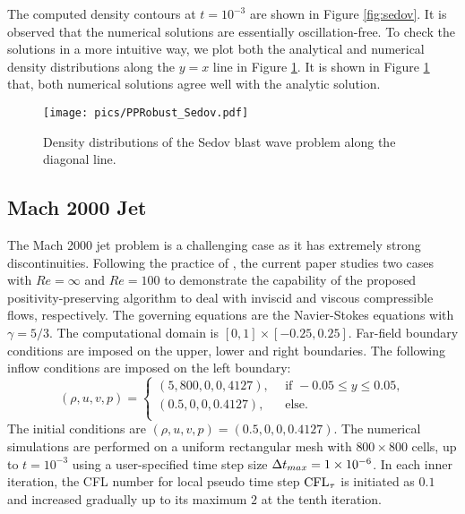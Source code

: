 The computed density contours at $t=10^{-3}$ are shown in Figure \ref{fig:sedov}. It is observed that the numerical solutions are essentially oscillation-free. To check the solutions in a more intuitive way, we plot both the analytical and numerical density distributions along the $y=x$ line in Figure \ref{fig:sedovLine}.
It is shown in Figure \ref{fig:sedovLine} that, both numerical solutions agree well with the analytic solution.

\begin{figure}[htbp]
    \centering
    \texttt{[image: pics/PPRobust\_Sedov.pdf]}
    \caption{Density distributions of the Sedov blast wave problem along the diagonal line.}
    \label{fig:sedovLine}
\end{figure}






\subsection{Mach 2000 Jet}

The Mach 2000 jet problem \cite{zhang2010positivity} is a challenging case as it has extremely strong discontinuities.
Following the practice of \cite{huang2024general},
the current paper studies two cases with $Re=\infty$ and $Re=100$ to demonstrate the capability of the proposed positivity-preserving algorithm to deal with inviscid and viscous compressible flows, respectively.
The governing equations are the Navier-Stokes equations with $\gamma=5/3$.
The computational domain is $[0,1]\times[-0.25,0.25]$.
Far-field boundary conditions are imposed on the upper, lower and right boundaries. The following inflow conditions are imposed on the left boundary:
\begin{equation}
    (\rho,u,v,p) = \left\{
    \begin{array}{ll}
        (5,800,0,0,4127),\ \  & \text{if } -0.05 \leq y \leq 0.05, \\
        (0.5,0,0,0.4127),\ \  & \text{else}.                       \\
    \end{array}
    \right.
\end{equation}
The initial conditions are $(\rho,u,v,p)=(0.5,0,0,0.4127)$.
The numerical simulations are performed on a uniform rectangular mesh with $800 \times 800$ cells, up to $t=10^{-3}$ using a user-specified time step size $\mathrm\Delta t_{max} = 1\times10^{-6}$.
In each inner iteration, the CFL number for local pseudo time step $\text{CFL}_\tau$ is initiated as $0.1$ 
and increased gradually up to its maximum $2$ at the tenth iteration.


